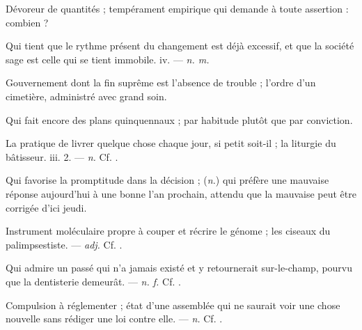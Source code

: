  Dévoreur de quantités ; tempérament empirique qui demande à toute assertion : combien ?

 Qui tient que le rythme présent du changement est déjà excessif, et que la société sage est celle qui se tient immobile.   iv. ---  \textit{n. m.}

 Gouvernement dont la fin suprême est l'absence de trouble ; l'ordre d'un cimetière, administré avec grand soin.

 Qui fait encore des plans quinquennaux ;  par habitude plutôt que par conviction.

 La pratique de livrer quelque chose chaque jour, si petit soit-il ; la liturgie du bâtisseur.   iii. 2. ---  \textit{n.} Cf. .

 Qui favorise la promptitude dans la décision ; (\textit{n.}) qui préfère une mauvaise réponse aujourd'hui à une bonne l'an prochain, attendu que la mauvaise peut être corrigée d'ici jeudi.

 Instrument moléculaire propre à couper et récrire le génome ; les ciseaux du palimpsestiste.  ---  \textit{adj.} Cf. .

 Qui admire un passé qui n'a jamais existé et y retournerait sur-le-champ, pourvu que la dentisterie demeurât. ---  \textit{n. f.} Cf. .

 Compulsion à réglementer ; état d'une assemblée qui ne saurait voir une chose nouvelle sans rédiger une loi contre elle. ---  \textit{n.} Cf. .

